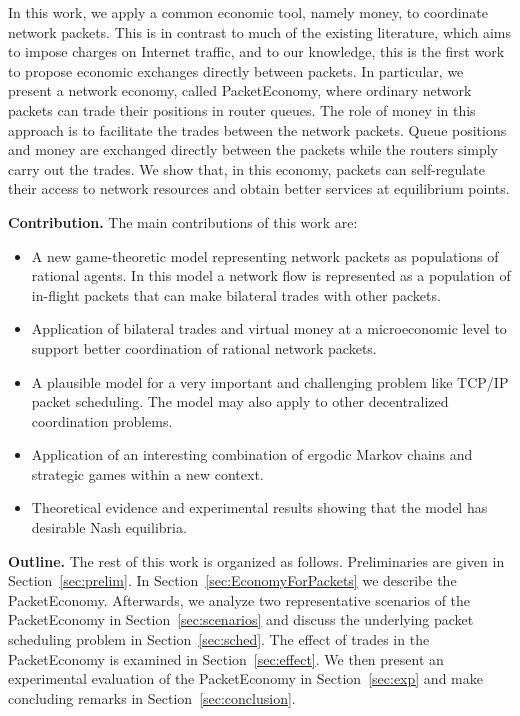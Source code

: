 \documentclass[letterpaper,10pt]{llncs}
\begin{document}
In this work, we apply a common economic tool, namely money,
to coordinate network packets. This is in contrast to much of the existing literature,
which aims to impose charges on Internet traffic, and to our knowledge,
this is the first work to propose economic exchanges directly between packets.
In particular, we present a network economy, called PacketEconomy, where
ordinary network packets can trade their positions in router queues.
The role of money in this approach is to facilitate the trades between the network packets.
Queue positions and money are exchanged directly between
the packets while the routers simply carry out the trades.
We show that, in this economy, packets can self-regulate their
access to network resources and obtain better services at equilibrium points.

\vspace{0.2cm}
\noindent
{\bf Contribution.} The main contributions of this work are:
\begin{itemize}
\renewcommand{\labelitemi}{}
\item A new game-theoretic model representing network packets as populations of rational agents.
In this model a network flow is represented as a population of in-flight packets that can make 
bilateral trades with other packets.
\item Application of bilateral trades and virtual money at a microeconomic level to  
support better coordination of rational network packets.
\item A plausible model for a very important and challenging problem like 
TCP/IP packet scheduling. The model may also apply to other decentralized 
coordination problems.
\item Application of an interesting combination of ergodic Markov chains and strategic
games within a new context.
\item Theoretical evidence and experimental results showing that the model has 
desirable Nash equilibria.
\end{itemize}

\vspace{0.2cm}
\noindent
{\bf Outline.} The rest of this work is organized as follows. 
Preliminaries are given in Section~\ref{sec:prelim}.
In Section~\ref{sec:EconomyForPackets} we describe the PacketEconomy.
Afterwards, we analyze two representative scenarios of the PacketEconomy
in Section~\ref{sec:scenarios} and discuss the underlying packet scheduling 
problem in Section~\ref{sec:sched}. 
The effect of trades in the PacketEconomy is examined in Section~\ref{sec:effect}. 
We then present an experimental evaluation of the PacketEconomy in Section~\ref{sec:exp} 
and make concluding remarks in Section~\ref{sec:conclusion}. 
\end{document}
